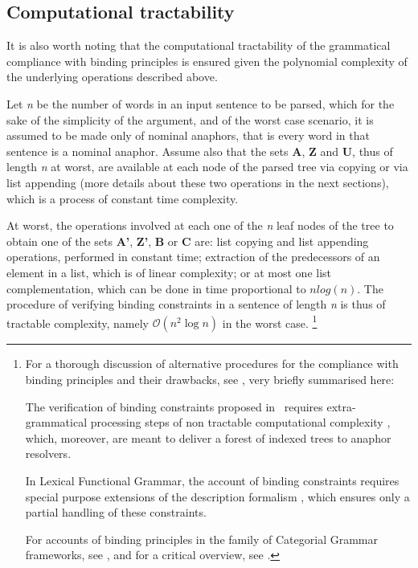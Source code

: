 \documentclass[output=paper
	        ,collection
	        ,collectionchapter
 	        ,biblatex
                ,babelshorthands
                ,newtxmath
                ,draftmode
                ,colorlinks, citecolor=brown
]{langscibook}
\begin{document}
\subsection{Computational tractability} 

It is also worth noting that the computational
tractability of the grammatical compliance with binding principles
is ensured given the polynomial complexity of the underlying operations
described above. 

Let {\it n} be
the number of words in an input sentence to be parsed, which for the
sake of the simplicity of the argument, and of the worst case scenario, 
it is assumed to be made only of nominal anaphors, that is every word in that sentence is a nominal anaphor. 
Assume also that the sets {\bf A}, {\bf Z} and {\bf U}, thus of length {\it n} at worst, 
are available at each node of the parsed tree via copying or via list appending 
(more details about these two operations in
the next sections), which is a process of constant time complexity. 

At worst, the operations involved at each one of the {\em n}
leaf nodes of the tree to obtain one of the sets {\bf A'}, {\bf Z'}, {\bf B} or {\bf C} are:
list copying and list appending operations, performed in constant time; extraction
of the predecessors of an element in a list, which is of linear complexity;
or at most one list complementation, which can be
done in time proportional to $n log(n)$. The procedure of verifying binding constraints in a sentence
of length {\it n} is thus of tractable complexity, namely $\mathcal{O}(n^2\log{}n)$ in the worst case.%
%
\footnote{
For a thorough discussion of alternative procedures for the compliance
with binding principles and their drawbacks, see \citep{branco:esslli2000}, very briefly summarised here:

The verification of binding constraints proposed in~\citep{chom:bind80,chom:lect81} requires extra-grammatical processing
steps of non tractable computational complexity \citep{correa:bind88, fong:index90}, which, moreover, 
are meant to deliver a forest of indexed
trees to anaphor resolvers. 

In Lexical Functional Grammar, the account of binding constraints requires special purpose 
extensions of the description
formalism \citep{dal:bind93}, which ensures only a partial handling
of these constraints.

For accounts of binding principles in  the family of Categorial Grammar frameworks, 
see \citep{szabol:89, hepple:90, morrill:2000}, 
and for a critical overview, see \citep{jaeger:2001}.
}
\end{document}
